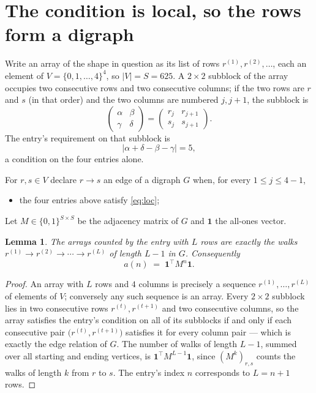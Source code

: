 \documentclass[11pt,a4paper]{article}
\theoremstyle{plain}
\newtheorem{lemma}[theorem]{Lemma}
\theoremstyle{definition}
\begin{document}
\section{The condition is local, so the rows form a digraph}

Write an array of the shape in question as its list of rows
$r^{(1)},r^{(2)},\dots$, each an element of
$V=\{0,1,\dots,4\}^{4}$, so $|V|=S=625$. A $2\times2$ subblock of the array
occupies two consecutive rows and two consecutive columns; if the two rows are $r$
and $s$ (in that order) and the two columns are numbered $j,j+1$,
the subblock is
\[
\begin{pmatrix}\alpha&\beta\\\gamma&\delta\end{pmatrix}=\begin{pmatrix}r_j&r_{j+1}\\s_j&s_{j+1}\end{pmatrix}.
\]
The entry's requirement on that subblock is
\begin{equation}\label{eq:loc}
|\alpha+\delta-\beta-\gamma|=5,
\end{equation}
a condition on the four entries alone.

For $r,s\in V$ declare $r\to s$ an edge of a digraph $G$ when, for every
$1\le j\le 4-1$,
\begin{itemize}
\item the four entries above satisfy \eqref{eq:loc};

\end{itemize}
Let $M\in\{0,1\}^{S\times S}$ be the adjacency matrix of $G$ and $\mathbf{1}$ the
all-ones vector.

\begin{lemma}\label{lem:walk}
The arrays counted by the entry with $L$ rows are exactly the walks
$r^{(1)}\to r^{(2)}\to\cdots\to r^{(L)}$ of length $L-1$ in $G$. Consequently
\[
a(n)\;=\;\mathbf{1}^{\!\top}M^{n}\mathbf{1} .
\]
\end{lemma}

\begin{proof}
An array with $L$ rows and $4$ columns is precisely a sequence
$r^{(1)},\dots,r^{(L)}$ of elements of $V$; conversely any such sequence is an array.
Every $2\times2$ subblock lies in two consecutive rows $r^{(t)},r^{(t+1)}$ and two
consecutive columns, so the array satisfies the entry's condition on all of its subblocks
if and only if each consecutive pair $\bigl(r^{(t)},r^{(t+1)}\bigr)$ satisfies it for
every column pair --- which is exactly the edge relation of $G$. The number of walks of
length $L-1$, summed over all starting and ending vertices, is
$\mathbf{1}^{\!\top}M^{L-1}\mathbf{1}$, since $(M^{k})_{r,s}$ counts the walks of
length $k$ from $r$ to $s$. The entry's index $n$ corresponds to $L=n+1$ rows.
\end{proof}
\end{document}
